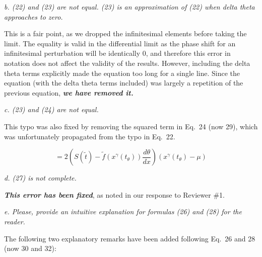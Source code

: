 \documentclass[11pt, letterpaper]{article}
\newenvironment{reviewer}{\itshape\color{gray}}{}
\newenvironment{manuscript}[1]{\begin{center}\begin{tcolorbox}[colback=green!5!white,colframe=green!75!black,width=0.8\textwidth,title={#1},breakable,fonttitle=\bfseries]}{\end{tcolorbox}\end{center}}
\begin{document}
\begin{reviewer}
b. (22) and (23) are not equal. (23) is an approximation of (22) when delta theta approaches to zero. 
\end{reviewer}

This is a fair point, as we dropped the infinitesimal elements before taking the limit.
The equality is valid in the differential limit as the phase shift for an infinitesimal perturbation will be identically 0, and therefore this error in notation does not affect the validity of the results.
However, including the delta theta terms explicitly made the equation too long for a single line.
Since the equation (with the delta theta terms included) was largely a repetition of the previous equation, {\bfseries\itshape we have removed it.}

\begin{reviewer}
c. (23) and (24) are not equal.
\end{reviewer}

This typo was also fixed by removing the squared term in Eq.~24 (now 29), which was unfortunately propagated from the typo in Eq.~22.

\begin{manuscript}{page 10}
  \begin{equation}
  = 2\left(S(\tilde{t}) - \tilde{f}(x^\gamma(t_\theta))\frac{d\theta}{dx}\right)\left(x^\gamma(t_\theta) - \mu\right)
    \tag{29}
  \end{equation}
\end{manuscript}

\begin{reviewer}
d. (27) is not complete.
\end{reviewer}

{\itshape\bfseries This error has been fixed}, as noted in our response to Reviewer \#1.

\begin{reviewer}
e. Please, provide an intuitive explanation for formulas (26) and (28) for the reader. 
\end{reviewer}

The following two explanatory remarks have been added following Eq.~26 and 28 (now 30 and 32):
\end{document}
